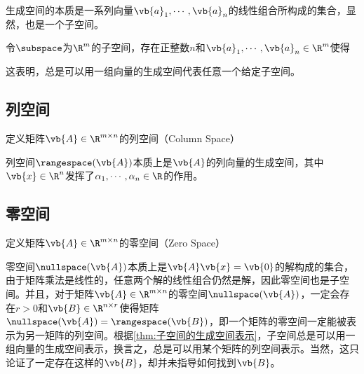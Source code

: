 生成空间的本质是一系列向量$\vb{a}_1,\cdots,\vb{a}_n$的线性组合所构成的集合，显然，也是一个子空间。

\begin{BoxTheorem}[子空间的生成空间表示]
    令$\subspace$为$\R^m$的子空间，存在正整数$n$和$\vb{a}_1,\cdots,\vb{a}_n\in\R^m$使得
\end{BoxTheorem}

这表明，总是可以用一组向量的生成空间代表任意一个给定子空间。

\subsection{列空间}

\begin{BoxDefinition}[列空间]
    定义矩阵$\vb{A}\in\R^{m\times n}$的列空间（Column Space）
\end{BoxDefinition}

列空间$\rangespace(\vb{A})$本质上是$\vb{A}$的列向量的生成空间，其中$\vb{x}\in\R^n$发挥了$\alpha_1,\cdots,\alpha_n\in\R$的作用。

\subsection{零空间}

\begin{BoxDefinition}[零空间]
    定义矩阵$\vb{A}\in\R^{m\times n}$的零空间（Zero Space）
\end{BoxDefinition}

零空间$\nullspace(\vb{A})$本质上是$\vb{A}\vb{x}=\vb{0}$的解构成的集合，由于矩阵乘法是线性的，任意两个解的线性组合仍然是解，因此零空间也是子空间。并且，对于矩阵$\vb{A}\in\R^{m\times n}$的零空间$\nullspace(\vb{A})$，一定会存在$r>0$和$\vb{B}\in\R^{n\times r}$使得矩阵$\nullspace(\vb{A})=\rangespace(\vb{B})$，即一个矩阵的零空间一定能被表示为另一矩阵的列空间。根据\cref{thm:子空间的生成空间表示}，子空间总是可以用一组向量的生成空间表示，换言之，总是可以用某个矩阵的列空间表示。当然，这只论证了一定存在这样的$\vb{B}$，却并未指导如何找到$\vb{B}$。

